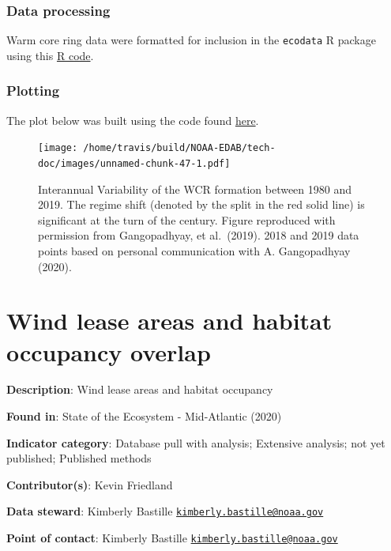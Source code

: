 \documentclass[
]{book}
\begin{document}
\hypertarget{data-processing-29}{%
\subsection{Data processing}\label{data-processing-29}}

Warm core ring data were formatted for inclusion in the \texttt{ecodata} R package using this \href{https://github.com/NOAA-EDAB/ecodata/blob/master/data-raw/get_warm_core_rings.R}{R code}.

\hypertarget{plotting-36}{%
\subsection{Plotting}\label{plotting-36}}

The plot below was built using the code found
\href{https://github.com/NOAA-EDAB/ecodata/blob/master/chunk-scripts/LTL.Rmd-warm-core-rings.R}{here}.

\begin{figure}
\centering
\texttt{[image: /home/travis/build/NOAA-EDAB/tech-doc/images/unnamed-chunk-47-1.pdf]}
\caption{\label{fig:unnamed-chunk-47} Interannual Variability of the WCR formation between 1980 and 2019. The regime shift (denoted by the split in the red solid line) is significant at the turn of the century. Figure reproduced with permission from Gangopadhyay, et al.~(2019). 2018 and 2019 data points based on personal communication with A. Gangopadhyay (2020).}
\end{figure}

\hypertarget{wind-lease-areas-and-habitat-occupancy-overlap}{%
\chapter{Wind lease areas and habitat occupancy overlap}\label{wind-lease-areas-and-habitat-occupancy-overlap}}

\textbf{Description}: Wind lease areas and habitat occupancy

\textbf{Found in}: State of the Ecosystem - Mid-Atlantic (2020)

\textbf{Indicator category}: Database pull with analysis; Extensive analysis; not yet published; Published methods

\textbf{Contributor(s)}: Kevin Friedland

\textbf{Data steward}: Kimberly Bastille \href{mailto:kimberly.bastille@noaa.gov}{\nolinkurl{kimberly.bastille@noaa.gov}}

\textbf{Point of contact}: Kimberly Bastille \href{mailto:kimberly.bastille@noaa.gov}{\nolinkurl{kimberly.bastille@noaa.gov}}
\end{document}
